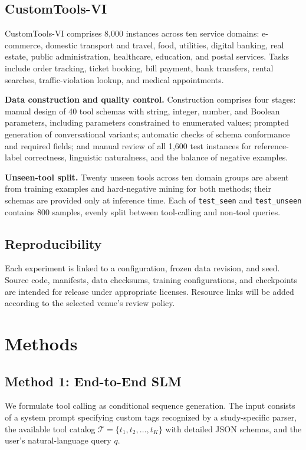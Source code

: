 \documentclass[10pt,twocolumn,a4paper]{article}
\begin{document}
\subsection{CustomTools-VI}
CustomTools-VI comprises 8,000 instances across ten service domains: e-commerce, domestic transport and travel, food, utilities, digital banking, real estate, public administration, healthcare, education, and postal services. Tasks include order tracking, ticket booking, bill payment, bank transfers, rental searches, traffic-violation lookup, and medical appointments.

\textbf{Data construction and quality control.} Construction comprises four stages: manual design of 40 tool schemas with string, integer, number, and Boolean parameters, including parameters constrained to enumerated values; prompted generation of conversational variants; automatic checks of schema conformance and required fields; and manual review of all 1,600 test instances for reference-label correctness, linguistic naturalness, and the balance of negative examples.

\textbf{Unseen-tool split.} Twenty unseen tools across ten domain groups are absent from training examples and hard-negative mining for both methods; their schemas are provided only at inference time. Each of \texttt{test\_seen} and \texttt{test\_unseen} contains 800 samples, evenly split between tool-calling and non-tool queries.

\subsection{Reproducibility}
Each experiment is linked to a configuration, frozen data revision, and seed. Source code, manifests, data checksums, training configurations, and checkpoints are intended for release under appropriate licenses. Resource links will be added according to the selected venue's review policy.

\section{Methods}

\subsection{Method 1: End-to-End SLM}
We formulate tool calling as conditional sequence generation. The input consists of a system prompt specifying custom tags recognized by a study-specific parser, the available tool catalog $\mathcal{T}=\{t_1,t_2,\dots,t_K\}$ with detailed JSON schemas, and the user's natural-language query $q$.
\end{document}

